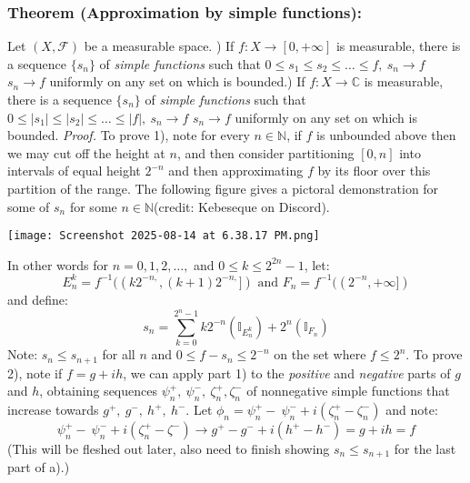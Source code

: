 \documentclass{article}
\begin{document}
\subsubsection{Theorem (Approximation by simple functions):}
Let $(X, \mathcal{F})$ be a measurable space. \newline {}) If  $f:X \to [0,+\infty]$ is measurable, there is a sequence $ \{s_n\}$ of \emph{simple functions} such that $0 \leq s_1 \leq s_2 \leq\ldots \leq f, \ s_n\to f$  $s_n\to f$ uniformly on any set on which is bounded.\newline {}) If  $f:X \to \mathbb{C}$ is measurable, there is a sequence $ \{s_n\}$ of \emph{simple functions} such that $0 \leq |s_1| \leq |s_2|\leq\ldots \leq |f|, \ s_n\to f$  $s_n\to f$ uniformly on any set on which is bounded.\newline \newline
\textit{Proof.}\newline \newline
To prove 1), note for every $n \in \mathbb{N}$, if $f$ is unbounded above then we may cut off the height at $n$, and then consider partitioning $[0,n]$ into intervals of equal height $2^{-n}$ and then approximating $f$ by its floor over this partition of the range. The following figure gives a pictoral demonstration for some of $s_n$ for some $n \in \mathbb{N}$(credit: Kebeseque on Discord). 
\begin{center}
    \texttt{[image: Screenshot 2025-08-14 at 6.38.17 PM.png]}
    \label{fig:placeholder}
\end{center} 
In other words for $n=0,1,2,\ldots,$ and $0\leq k\leq2^{2n}-1$, let:
\[
E^k_n=f^{-1}((k2^{-n,},(k+1)2^{-n,}]) \text{ and } F_n=f^{-1}((2^{-n},+\infty])
\] and define:
\[
s_n=\sum_{k=0}^{2^{n}-1}k2^{-n}(\mathbb{I}_{E_n^k})+2^n(\mathbb{I}_{F_n})
\]
Note: $s_n\leq s_{n+1}$ for all $n$ and $0 \leq f-s_n\leq2^{-n}$ on the set where $f \leq 2^n$.
\newline \newline
To prove 2), note if $f=g+ih$, we can apply part 1) to the \emph{positive} and \emph{negative} parts of $g$ and $h$, obtaining sequences $\psi^+_n, \ \psi^-_n, \ \zeta^+_n, \zeta^-_n$ of nonnegative simple functions that increase towards $g^+, \ g^-, \ h^+, \ h^-$. Let $\phi_n= \psi^+_n-\ \psi^-_n+ i( \zeta^+_n- \zeta^-_n)$ and note:
\[
\psi^+_n-\ \psi^-_n+ i( \zeta^+_n- \zeta^-)\to g^+-g^-+i(h^+-h^-)=g+ih=f
\]
(This will be fleshed out later, also need to finish showing $s_n\leq s_{n+1}$ for the last part of a).)
\end{document}
